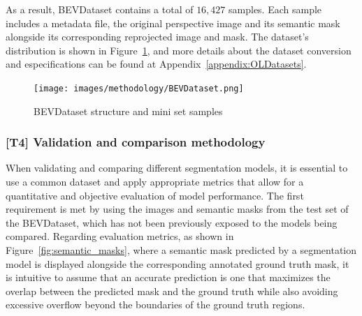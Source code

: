 As a result, BEVDataset contains a total of $16,427$ samples. Each sample includes a metadata file, the original perspective image and its semantic mask alongside its corresponding  reprojected image and mask. The dataset's distribution is shown in Figure~\ref{fig:bev_dataset}, and more details about the dataset conversion and especifications can be found at Appendix~\ref{appendix:OLDatasets}.

\begin{figure}[!ht]
    \centering
    \texttt{[image: images/methodology/BEVDataset.png]}
    \caption{BEVDataset structure and mini set samples}
    \label{fig:bev_dataset}
\end{figure}

\subsubsection{[T4] Validation and comparison methodology}
When validating and comparing different segmentation models, it is essential to use a common dataset and apply appropriate metrics that allow for a quantitative and objective evaluation of model performance. The first requirement is met by using the  images and semantic masks from the test set of the BEVDataset, which has not been previously exposed to the models being compared. Regarding evaluation metrics, as shown in Figure~\ref{fig:semantic_masks}, where a semantic mask predicted by a segmentation model is displayed alongside the corresponding annotated ground truth mask, it is intuitive to assume that an accurate prediction is one that maximizes the overlap between the predicted mask and the ground truth while also avoiding excessive overflow beyond the boundaries of the ground truth regions.

